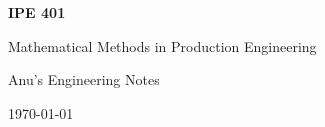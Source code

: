 \documentclass[12pt, a4paper]{book}
\newcommand{\subjectcode}{IPE 401}
\newcommand{\subjecttitle}{Mathematical Methods in Production Engineering}
\begin{document}
\begin{titlepage}
  \centering
  \vspace*{3cm}
  {\Huge\bfseries \subjectcode \par}
  \vspace{0.5em}
  {\LARGE \subjecttitle \par}
  \vfill
  {\large Anu's Engineering Notes \par}
  \vspace{0.5em}
  {\normalsize \today \par}
\end{titlepage}

\tableofcontents
\newpage







\end{document}
